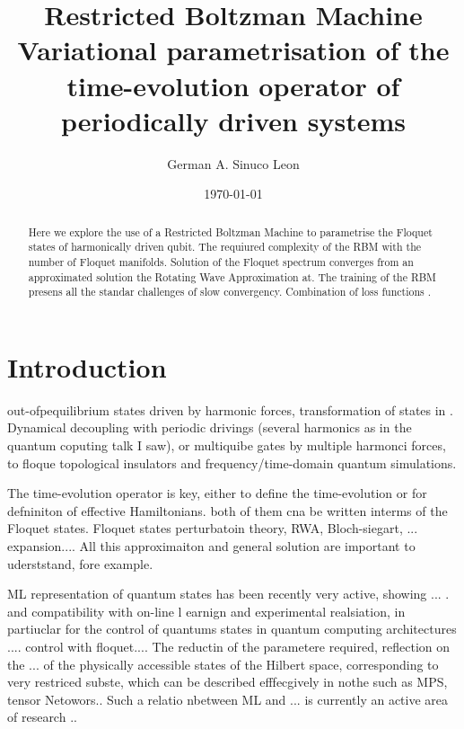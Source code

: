 \documentclass[pra,twocolumn,showkeys,preprintnumbers, amsmath,amssymb, aps,A4paper]{revtex4-1}
\begin{document}

\title{Restricted Boltzman Machine Variational parametrisation of the time-evolution operator of periodically driven systems}

\author{German A. Sinuco Leon}


\date{\today}
\begin{abstract}
Here we explore the use of a Restricted Boltzman Machine to parametrise the Floquet states of harmonically driven qubit. The requiured complexity of the RBM with the number of Floquet manifolds. Solution of the Floquet spectrum converges from an approximated solution the Rotating Wave Approximation at. The training of the RBM presens all the standar challenges of slow convergency. Combination of loss functions . 
\end{abstract}

 
\maketitle
\section{\label{sec:Introduction} Introduction}

out-ofpequilibrium states driven by harmonic forces, transformation of states in . Dynamical decoupling with periodic drivings (several harmonics as in the quantum coputing talk I saw), or multiquibe gates by multiple harmonci forces, to floque topological insulators and frequency/time-domain quantum simulations.

The time-evolution operator is key, either to define the time-evolution or for defniniton of effective Hamiltonians. both of them cna be written interms of the Floquet states. Floquet states perturbatoin theory, RWA, Bloch-siegart, ... expansion.... All this approximaiton and general solution are important to uderststand, fore example. 


ML representation of quantum states has been recently very active, showing ... . and compatibility with on-line l earnign and experimental realsiation, in partiuclar for the control of quantums states in quantum computing architectures .... control with floquet.... The reductin of the parametere required, reflection on the ... of the physically accessible states of the Hilbert space, corresponding to very restriced subste, which can be described efffecgively in nothe such as MPS, tensor Netowors.. Such a relatio nbetween ML and ... is currently an active area of research ..
\end{document}
